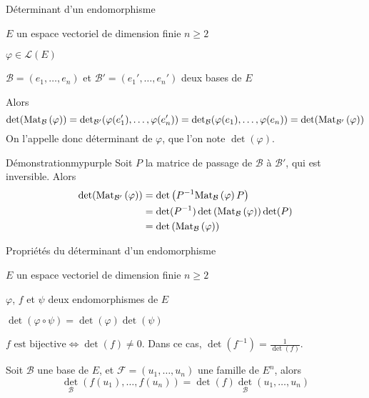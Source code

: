     \begin{theo}{Déterminant d’un endomorphisme}{}
        \begin{soient}
            \item $E$ un espace vectoriel de dimension finie $n \geq 2$
            \item $\varphi \in \mathcal{L}(E)$
            \item $\mathcal{B} = (e_1, \ldots, e_n)$ et $\mathcal{B}' = (e_1',\ldots,e_n')$ deux bases de $E$
        \end{soient}
        Alors \[ \operatorname{det}(\text{Mat}_{\mathcal{B}}\left(\varphi\right)) =  \operatorname{det}_{\mathcal{B}'}(\varphi(e_1'),\ldots,\varphi(e_n')) = \operatorname{det}_{\mathcal{B}}(\varphi(e_1),\ldots,\varphi(e_n)) = \operatorname{det}(\text{Mat}_{\mathcal{B}'}\left(\varphi\right)) \]
        On l’appelle donc déterminant de $\varphi$, que l’on note $\det(\varphi)$.
    \end{theo}

    \begin{demo}{Démonstration}{mypurple}
        Soit $P$ la matrice de passage de $\mathcal{B}$ à $\mathcal{B}'$, qui est inversible. Alors 
        \begin{align*}
            \operatorname{det}(\text{Mat}_{\mathcal{B}'}\left(\varphi\right)) 
            &= \operatorname{det}\left(P^{-1} \text{Mat}_{\mathcal{B}}\left(\varphi\right) P\right) \\
            &= \operatorname{det}(P^{-1}) \operatorname{det}\left(\text{Mat}_{\mathcal{B}}\left(\varphi\right)\right) \operatorname{det}(P) \\
            &= \operatorname{det}\left(\text{Mat}_{\mathcal{B}}\left(\varphi\right)\right)
        \end{align*}
    \end{demo}

    \begin{prop}{Propriétés du déterminant d’un endomorphisme}{}
        \begin{soient}
            \item $E$ un espace vectoriel de dimension finie $n \geq 2$
            \item $\varphi$, $f$ et $\psi$ deux endomorphismes de $E$
        \end{soient}
        \begin{alors}
            \item $\det(\varphi \circ \psi) = \det(\varphi)\det(\psi)$
            \item $f \text{ est bijective} \iff \det(f) \neq 0$. Dans ce cas, $\det(f^{-1}) = \frac{1}{\det(f)}$.
            \item Soit $\mathcal{B}$ une base de $E$, et $\mathcal{F} = (u_1,\ldots,u_n)$ une famille de $E^n$, alors 
            \[ \det_{\mathcal{B}}\left(f(u_1), \ldots, f(u_n)\right) = \det(f) \det_{\mathcal{B}}(u_1,\ldots,u_n) \]
        \end{alors}
    \end{prop}

